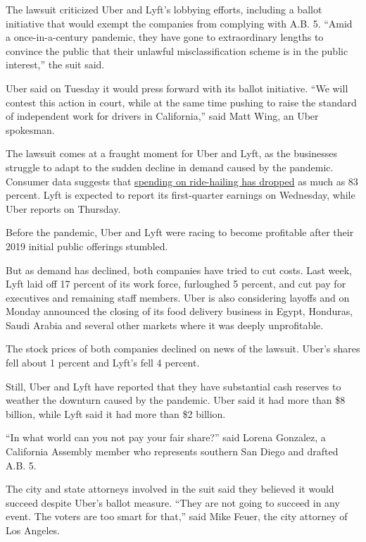 The lawsuit criticized Uber and Lyft's lobbying efforts, including a
ballot initiative that would exempt the companies from complying with
A.B. 5. ``Amid a once-in-a-century pandemic, they have gone to
extraordinary lengths to convince the public that their unlawful
misclassification scheme is in the public interest,'' the suit said.

Uber said on Tuesday it would press forward with its ballot initiative.
``We will contest this action in court, while at the same time pushing
to raise the standard of independent work for drivers in California,''
said Matt Wing, an Uber spokesman.

The lawsuit comes at a fraught moment for Uber and Lyft, as the
businesses struggle to adapt to the sudden decline in demand caused by
the pandemic. Consumer data suggests that
\href{https://www.nytimes3xbfgragh.onion/2020/04/17/technology/uber-lift-coronavirus.html}{spending
on ride-hailing has dropped} as much as 83 percent. Lyft is expected to
report its first-quarter earnings on Wednesday, while Uber reports on
Thursday.

Before the pandemic, Uber and Lyft were racing to become profitable
after their 2019 initial public offerings stumbled.

But as demand has declined, both companies have tried to cut costs. Last
week, Lyft laid off 17 percent of its work force, furloughed 5 percent,
and cut pay for executives and remaining staff members. Uber is also
considering layoffs and on Monday announced the closing of its food
delivery business in Egypt, Honduras, Saudi Arabia and several other
markets where it was deeply unprofitable.

The stock prices of both companies declined on news of the lawsuit.
Uber's shares fell about 1 percent and Lyft's fell 4 percent.

Still, Uber and Lyft have reported that they have substantial cash
reserves to weather the downturn caused by the pandemic. Uber said it
had more than \$8 billion, while Lyft said it had more than \$2 billion.

``In what world can you not pay your fair share?'' said Lorena Gonzalez,
a California Assembly member who represents southern San Diego and
drafted A.B. 5.

The city and state attorneys involved in the suit said they believed it
would succeed despite Uber's ballot measure. ``They are not going to
succeed in any event. The voters are too smart for that,'' said Mike
Feuer, the city attorney of Los Angeles.

